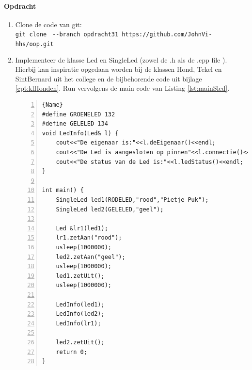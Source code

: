 \paragraph{Opdracht} 
\begin{enumerate}[label=(\alph*)]
\item Clone de code van git: \\
{\small \texttt{git clone } \verb|--|\texttt{branch opdracht31 https://github.com/JohnVi-hhs/oop.git}}
\item
Implementeer de klasse Led en SingleLed (zowel de .h als de .cpp file ).
Hierbij kan inspiratie opgedaan worden bij de klassen Hond, Tekel en SintBernard uit het college en de bijbehorende code uit bijlage \ref{cpt:klHonden}. Run vervolgens de main code van Listing \ref{lst:mainSled}.

\begin{lstlisting}[caption=main functie om de klasse SingleLed te testen. ,frame=trbl,firstnumber=1,numbers=left,label={lst:mainSled}]{Name}
#define GROENELED 132
#define GELELED 134
void LedInfo(Led& l) {
	cout<<"De eigenaar is:"<<l.deEigenaar()<<endl;
	cout<<"De Led is aangesloten op pinnen"<<l.connectie()<<endl;
	cout<<"De status van de Led is:"<<l.ledStatus()<<endl;
}

int main() {
	SingleLed led1(RODELED,"rood","Pietje Puk");
	SingleLed led2(GELELED,"geel");
	
	Led &lr1(led1);
	lr1.zetAan("rood");
	usleep(1000000);
	led2.zetAan("geel"); 
	usleep(1000000);
	led1.zetUit();
	usleep(1000000);
	
	LedInfo(led1);
	LedInfo(led2);
	LedInfo(lr1);
	
	led2.zetUit();
	return 0;
}

\end{lstlisting}


\end{enumerate}
